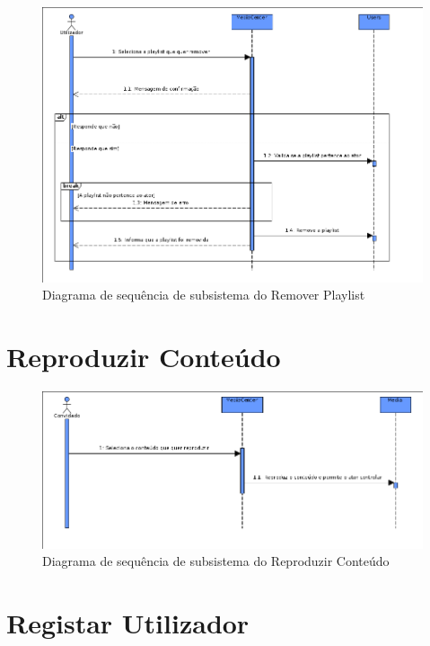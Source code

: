 \documentclass[a4paper]{report}
\begin{document}
\begin{figure}[H]
	\centering 
    \includegraphics[width=\textwidth]{images/remplaylistSub.png}  
    \caption{Diagrama de sequência de subsistema do Remover Playlist}
\end{figure}

\section{Reproduzir Conteúdo}

\begin{figure}[H]
	\centering 
    \includegraphics[width=\textwidth]{images/repconteudoSub.png}  
    \caption{Diagrama de sequência de subsistema do Reproduzir Conteúdo}
\end{figure}

\section{Registar Utilizador}
\end{document}
